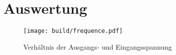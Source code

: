 \section{Auswertung}
\label{sec:Auswertung}
\begin{figure}
    \centering
    \caption{Verhältnis der Ausgangs- und Eingangsspannung}
    \label{fig:frequence}
    \texttt{[image: build/frequence.pdf]}
\end{figure}
